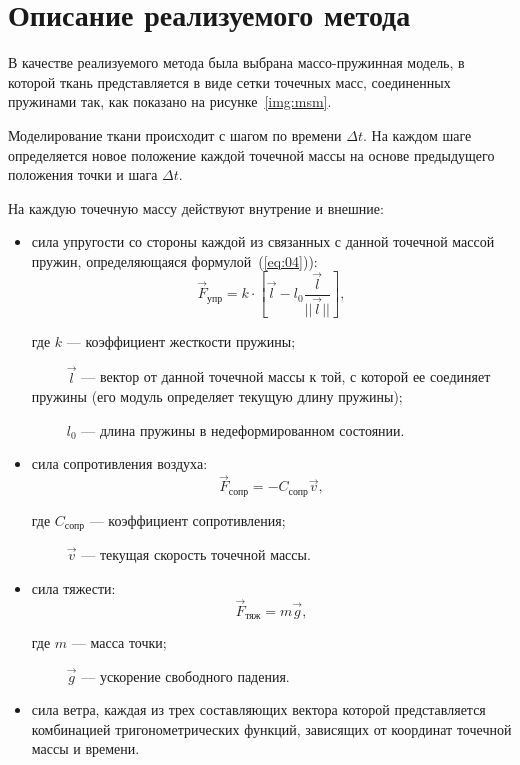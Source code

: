 \section{Описание реализуемого метода}

В качестве реализуемого метода была выбрана массо-пружинная модель, в которой
ткань представляется в виде сетки точечных масс, соединенных пружинами так, как
показано на рисунке~\ref{img:msm}.


Моделирование ткани происходит с шагом по времени $\Delta t$. На каждом шаге
определяется новое положение каждой точечной массы на основе предыдущего
положения точки и шага $\Delta t$.

На каждую точечную массу действуют внутрение и
внешние:
\begin{itemize}
    \item сила упругости со стороны каждой из связанных с данной точечной массой
        пружин, определяющаяся формулой~(\ref{eq:04})):
        \begin{equation}\label{eq:04}
            \vec{F}_{\text{упр}} = k \cdot [\vec{l} -
            l_0\frac{\vec{l}}{||\vec{l}||}],
        \end{equation}

        где $k$ --- коэффициент жесткости пружины;

        ~~~~~$\vec{l}$ --- вектор от данной точечной массы к той, с которой ее
        соединяет пружины (его модуль определяет текущую длину пружины);

        ~~~~~$l_0$ --- длина пружины в недеформированном состоянии.

    \item сила сопротивления воздуха:
        \begin{equation}\label{eq:05}
            \vec{F}_{\text{сопр}} = - C_{\text{сопр}}\vec{v},
        \end{equation}

        где $C_{\text{сопр}}$ --- коэффициент сопротивления;
        
        ~~~~~$\vec{v}$ --- текущая скорость точечной массы.

    \item сила тяжести:
        \begin{equation}\label{eq:06}
            \vec{F}_{\text{тяж}} = m\vec{g},
        \end{equation}

        где $m$ --- масса точки;

        ~~~~~$\vec{g}$ --- ускорение свободного падения.

    \item сила ветра, каждая из трех составляющих вектора которой
        представляется комбинацией тригонометрических функций,
        зависящих от координат точечной массы и времени.
\end{itemize}

